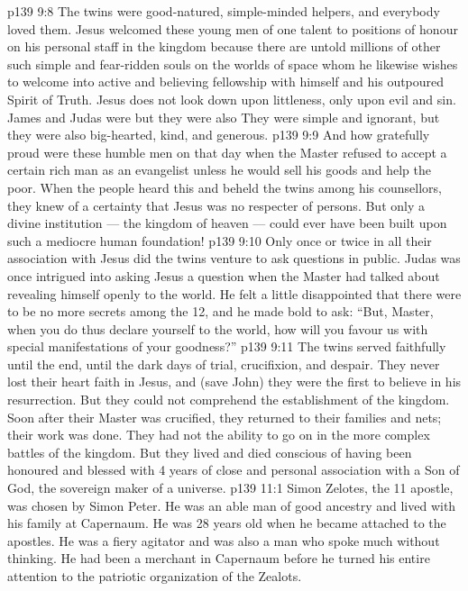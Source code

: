 \vs p139 9:8 \pc The twins were good\hyp{}natured, simple\hyp{}minded helpers, and everybody loved them. Jesus welcomed these young men of one talent to positions of honour on his personal staff in the kingdom because there are untold millions of other such simple and fear\hyp{}ridden souls on the worlds of space whom he likewise wishes to welcome into active and believing fellowship with himself and his outpoured Spirit of Truth. Jesus does not look down upon littleness, only upon evil and sin. James and Judas were  but they were also  They were simple and ignorant, but they were also big\hyp{}hearted, kind, and generous.
\vs p139 9:9 And how gratefully proud were these humble men on that day when the Master refused to accept a certain rich man as an evangelist unless he would sell his goods and help the poor. When the people heard this and beheld the twins among his counsellors, they knew of a certainty that Jesus was no respecter of persons. But only a divine institution --- the kingdom of heaven --- could ever have been built upon such a mediocre human foundation!
\vs p139 9:10 Only once or twice in all their association with Jesus did the twins venture to ask questions in public. Judas was once intrigued into asking Jesus a question when the Master had talked about revealing himself openly to the world. He felt a little disappointed that there were to be no more secrets among the 12, and he made bold to ask: “But, Master, when you do thus declare yourself to the world, how will you favour us with special manifestations of your goodness?”
\vs p139 9:11 \pc The twins served faithfully until the end, until the dark days of trial, crucifixion, and despair. They never lost their heart faith in Jesus, and (save John) they were the first to believe in his resurrection. But they could not comprehend the establishment of the kingdom. Soon after their Master was crucified, they returned to their families and nets; their work was done. They had not the ability to go on in the more complex battles of the kingdom. But they lived and died conscious of having been honoured and blessed with 4 years of close and personal association with a Son of God, the sovereign maker of a universe.
\vs p139 11:1 Simon Zelotes, the 11 apostle, was chosen by Simon Peter. He was an able man of good ancestry and lived with his family at Capernaum. He was 28 years old when he became attached to the apostles. He was a fiery agitator and was also a man who spoke much without thinking. He had been a merchant in Capernaum before he turned his entire attention to the patriotic organization of the Zealots.
